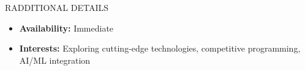 \documentclass{resume} %
\begin{document}

\begin{rSection}{RADDITIONAL DETAILS}

\begin{itemize}
    \item \textbf{Availability:} Immediate
    \item \textbf{Interests:} Exploring cutting-edge technologies, competitive programming, AI/ML integration
\end{itemize}

\end{rSection}
\end{document}
